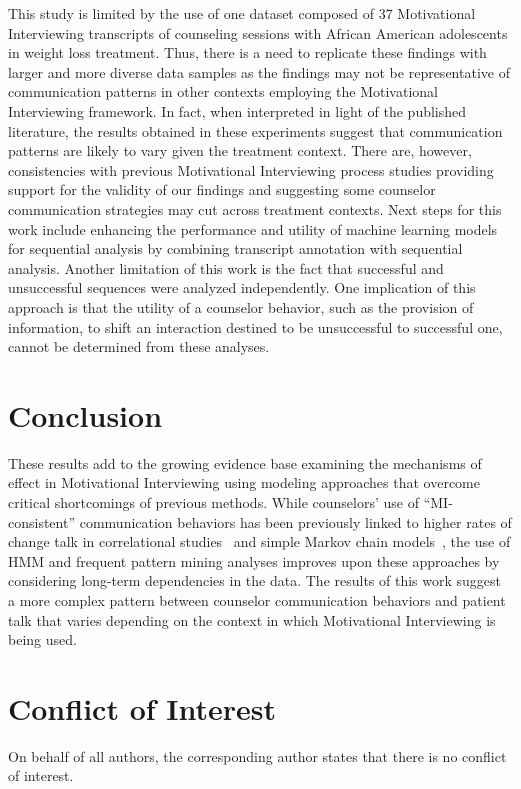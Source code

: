 This study is limited by the use of one dataset composed of 37 Motivational Interviewing transcripts of counseling sessions with African American adolescents in weight loss treatment. Thus, there is a need to replicate these findings with larger and more diverse data samples as the findings may not be representative of communication patterns in other contexts employing the Motivational Interviewing framework. In fact, when interpreted in light of the published literature, the results obtained in these experiments suggest that communication patterns are likely to vary given the treatment context. There are, however, consistencies with previous Motivational Interviewing process studies providing support for the validity of our findings and suggesting some counselor communication strategies may cut across treatment contexts. Next steps for this work include enhancing the performance and utility of machine learning models for sequential analysis by combining transcript annotation with sequential analysis. Another limitation of this work is the fact that successful and unsuccessful sequences were analyzed independently. One implication of this approach is that the utility of a counselor behavior, such as the provision of information, to shift an interaction destined to be unsuccessful to successful one, cannot be determined from these analyses.

\section{Conclusion}
\label{sec:conclusion}
These results add to the growing evidence base examining the mechanisms of effect in Motivational Interviewing using modeling approaches that overcome critical shortcomings of previous methods. While counselors’ use of ``MI-consistent'' communication behaviors has been previously linked to higher rates of change talk in correlational studies~\cite{moyers2006therapist, catley2006adherence, thrasher2006motivational, mccambridge2011fidelity} and simple Markov chain models~\cite{moyers2006therapist, moyers2009session, gaume2010counselor}, the use of HMM and frequent pattern mining analyses improves upon these approaches by considering long-term dependencies in the data. The results of this work suggest a more complex pattern between counselor communication behaviors and patient talk that varies depending on the context in which Motivational Interviewing is being used.  

\section{Conflict of Interest}
\label{sec:conflictofInterest}
On behalf of all authors, the corresponding author states that there is no conflict of interest.

